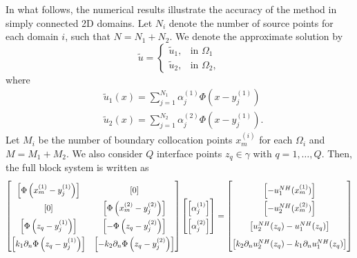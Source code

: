 In what follows, the numerical results illustrate the accuracy of the method in simply connected 2D domains. Let \(N_i\) denote the number of source points for each domain \(i\), such that \(N=N_1+N_2\). We denote the approximate solution by
\[
    \tilde{u} = \begin{cases}
        \tilde{u}_1, & \text{in } \Omega_1\\
        \tilde{u}_2, & \text{in } \Omega_2,
    \end{cases}
\]
where
\begin{align*}
    &\tilde{u}_1(x) = \sum_{j=1}^{N_1} \alpha^{(1)}_j \Phi\left(x-y_j^{(1)}\right)\\
    &\tilde{u}_2(x) = \sum_{j=1}^{N_2} \alpha^{(2)}_j \Phi\left(x-y_j^{(1)}\right).
\end{align*}
Let \(M_i\) be the number of boundary collocation points \(x^{(i)}_{m}\) for each \(\Omega_i\) and \(M=M_1+M_2\). We also consider \(Q\) interface points \(z_q \in \gamma\) with \(q=1,\dots,Q\). Then, the full block system is written as
\begin{equation}\label{MFS_transmission_classical_matrices_system}
    \renewcommand{\arraystretch}{1.75} %
    \begin{bmatrix}
        \left[\Phi\left(x^{(1)}_{m}-y_j^{(1)}\right)\right] & [0] \\
        [0] & \left[\Phi\left(x^{(2)}_{m}-y_j^{(2)}\right)\right] \\
        \left[\Phi\left(z_q-y_j^{(1)}\right)\right] & \left[-\Phi\left(z_q-y_j^{(2)}\right)\right] \\
        \left[k_1\partial_n \Phi\left(z_q-y_j^{(1)}\right)\right] & \left[-k_2 \partial_n \Phi\left(z_q-y_j^{(2)}\right)\right]
    \end{bmatrix}
    \begin{bmatrix}
        \left[\alpha^{(1)}_j\right]\\
        \left[\alpha^{(2)}_j\right]
    \end{bmatrix}=
    \begin{bmatrix}
        \left[-u_1^{NH}(x^{(1)}_{m})\right]\\
        \left[-u_2^{NH}(x^{(2)}_{m})\right]\\
        \left[u_2^{NH}(z_q)-u_1^{NH}(z_q)\right]\\
        \left[k_2 \partial_n u_2^{NH}(z_q)- k_1 \partial_n u_1^{NH}(z_q)\right]\\
    \end{bmatrix}
\end{equation}

